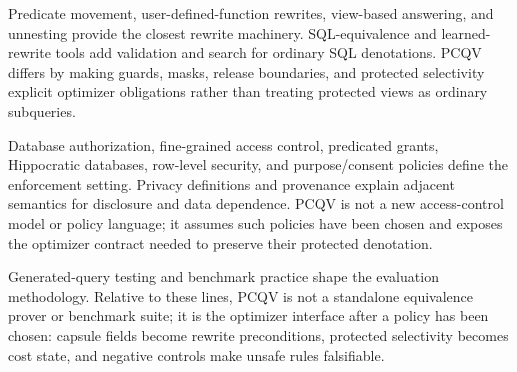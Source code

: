 \documentclass[conference]{IEEEtran}
\newcommand{\pcqv}{PCQV}
\begin{document}
Predicate movement, user-defined-function rewrites, view-based answering, and unnesting provide the closest rewrite machinery\cite{hellerstein1993predicate,chaudhuri1996udf,levy1994predicate,chaudhuri1995views,goldstein2001views,halevy2001views,pottinger2001minicon,larson1985derived,ganski1987nested,neumann2015unnesting}. SQL-equivalence and learned-rewrite tools add validation and search for ordinary SQL denotations\cite{chu2017cosette,chu2017hottsql,zhou2019symbolic,wang2022wetune,zhou2023learnedrewrite,ding2024lia,wang2024qed}. \pcqv{} differs by making guards, masks, release boundaries, and protected selectivity explicit optimizer obligations rather than treating protected views as ordinary subqueries.

Database authorization, fine-grained access control, predicated grants, Hippocratic databases, row-level security, and purpose/consent policies define the enforcement setting\cite{stonebraker1974access,griffiths1976authorization,sandhu1996rbac,bertino2005database,rizvi2004fgac,kabra2006redundancy,lefevre2004disclosure,agrawal2002hippocratic,agrawal2003privacy,agrawal2005privacy,chaudhuri2007predicated,byun2008purpose,konstantinidis2022consent,dar2023rls,paduroiu2024membrane,xue2020guardspark,xue2023sparkac}. Privacy definitions and provenance explain adjacent semantics for disclosure and data dependence\cite{sweeney2002kanonymity,machanavajjhala2007ldiversity,li2007tcloseness,dwork2006calibrating,buneman2001provenance,cui2000lineage,green2007provenance}. \pcqv{} is not a new access-control model or policy language; it assumes such policies have been chosen and exposes the optimizer contract needed to preserve their protected denotation.

Generated-query testing and benchmark practice shape the evaluation methodology\cite{rigger2020pqs,rigger2020norec,rigger2020tlp,ba2023qpg,ba2024dqp,tpch,tpcds,oneil2009ssb,nambiar2006tpcds,pavlo2009benchmark,olston2008pig,armbrust2015sparksql,boncz2005x100,neumann2011compiling}. Relative to these lines, \pcqv{} is not a standalone equivalence prover or benchmark suite; it is the optimizer interface after a policy has been chosen: capsule fields become rewrite preconditions, protected selectivity becomes cost state, and negative controls make unsafe rules falsifiable.
\end{document}

